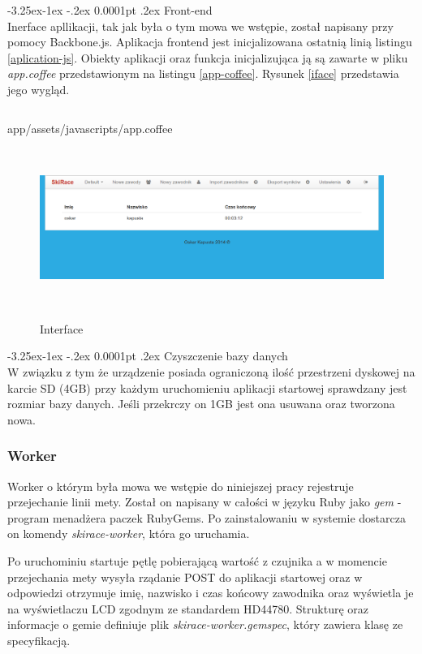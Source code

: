 \documentclass[11pt,a4paper, twoside]{article}
\makeatletter
\renewcommand\paragraph{\@startsection{paragraph}{4}{\z@}%
                                     {-3.25ex\@plus -1ex \@minus -.2ex}%
                                     {0.0001pt \@plus .2ex}%
                                     {\normalfont\normalsize\bfseries}}
\makeatother
\begin{document}
\paragraph{Front-end} ~\\
Inerface apllikacji, tak jak była o tym mowa we wstępie, został napisany przy pomocy Backbone.js. Aplikacja frontend jest inicjalizowana ostatnią linią listingu \ref{aplication-js}. Obiekty aplikacji oraz funkcja inicjalizująca ją są zawarte w pliku \emph{app.coffee} przedstawionym na listingu \ref{app-coffee}. Rysunek \ref{iface} przedstawia jego wygląd.
\begin{listing}[H]
\inputminted{js}{./src/app.coffee}
\caption{app/assets/javascripts/app.coffee}
$\label{app-coffee}$
\end{listing}
\begin{figure}[ht]
\includegraphics[scale=0.35]{./img/interface.png}
\caption{Interface}
$\label{iface}$
\end{figure}
\newpage
\paragraph{Czyszczenie bazy danych} ~\\
W związku z tym że urządzenie posiada ograniczoną ilość przestrzeni dyskowej na karcie SD (4GB) przy każdym uruchomieniu aplikacji startowej sprawdzany jest rozmiar bazy danych. Jeśli przekrczy on 1GB jest ona usuwana oraz tworzona nowa.
\newpage
\subsubsection{Worker}
Worker o którym była mowa we wstępie do niniejszej pracy rejestruje przejechanie linii mety. Został on napisany w całości w języku Ruby jako \emph{gem} - program menadżera paczek RubyGems. Po zainstalowaniu w systemie dostarcza on komendy \emph{skirace-worker}, która go uruchamia.


Po uruchominiu startuje pętlę pobierającą wartość z czujnika a w momencie przejechania mety wysyła rządanie POST do aplikacji startowej oraz w odpowiedzi otrzymuje imię, nazwisko i czas końcowy zawodnika oraz wyświetla je na wyświetlaczu LCD zgodnym ze standardem HD44780. Strukturę oraz informacje o gemie definiuje plik \emph{skirace-worker.gemspec}, który zawiera klasę ze specyfikacją.
\end{document}
